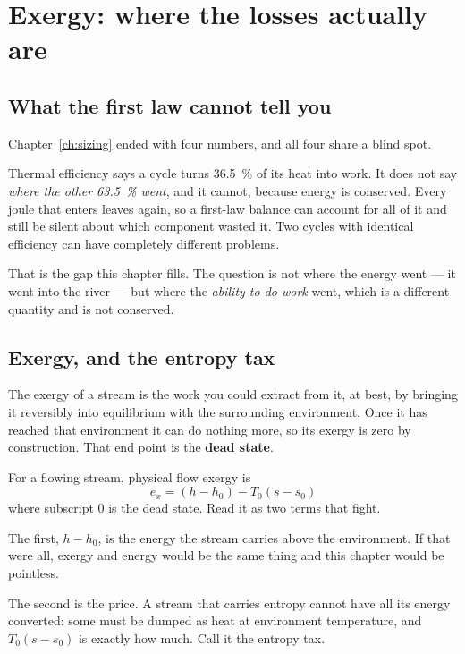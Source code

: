 \documentclass[11pt,a4paper]{report}
\begin{document}
\chapter{Exergy: where the losses actually are}
\label{ch:exergy}

\section{What the first law cannot tell you}

Chapter~\ref{ch:sizing} ended with four numbers, and all four share a
blind spot.

Thermal efficiency says a cycle turns \SI{36.5}{\percent} of its heat into
work. It does not say \emph{where the other \SI{63.5}{\percent} went}, and
it cannot, because energy is conserved. Every joule that enters leaves
again, so a first-law balance can account for all of it and still be silent
about which component wasted it. Two cycles with identical efficiency can
have completely different problems.

That is the gap this chapter fills. The question is not where the energy
went --- it went into the river --- but where the \emph{ability to do work}
went, which is a different quantity and is not conserved.

\section{Exergy, and the entropy tax}

The exergy of a stream is the work you could extract from it, at best, by
bringing it reversibly into equilibrium with the surrounding environment.
Once it has reached that environment it can do nothing more, so its exergy
is zero by construction. That end point is the \textbf{dead state}.

For a flowing stream, physical flow exergy is
\begin{equation}
  e_x = (h - h_0) - T_0 (s - s_0)
  \label{eq:exergy}
\end{equation}
where subscript 0 is the dead state. Read it as two terms that fight.

The first, $h - h_0$, is the energy the stream carries above the
environment. If that were all, exergy and energy would be the same thing
and this chapter would be pointless.

The second is the price. A stream that carries entropy cannot have all its
energy converted: some must be dumped as heat at environment temperature,
and $T_0(s - s_0)$ is exactly how much. Call it the entropy tax.
\end{document}
